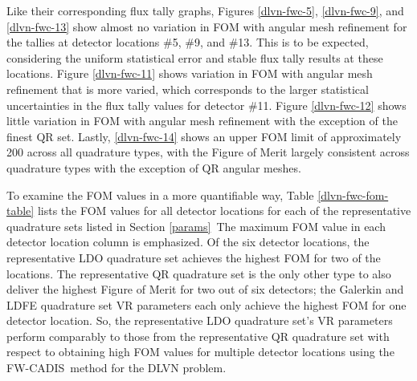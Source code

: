 \documentclass{article} %
\newcommand{\fwc}{\mbox{FW-CADIS}}
\begin{document}
Like their corresponding flux tally graphs, Figures \ref{dlvn-fwc-5},
\ref{dlvn-fwc-9}, and \ref{dlvn-fwc-13} show almost no variation in FOM with
angular mesh refinement for the tallies at detector locations \#5, \#9, and
\#13. This is to be expected, considering the uniform statistical error and
stable flux tally results at these locations. Figure \ref{dlvn-fwc-11} shows
variation in FOM with angular mesh refinement that is more varied, which
corresponds to the larger statistical uncertainties in the flux tally values
for detector \#11. Figure \ref{dlvn-fwc-12} shows little variation in FOM with
angular mesh refinement with the exception of the finest QR set. Lastly,
\ref{dlvn-fwc-14} shows an upper FOM limit of approximately 200 across all
quadrature types, with the Figure of Merit largely consistent across
quadrature types with the exception of QR angular meshes.

To examine the FOM values in a more quantifiable way, Table 
\ref{dlvn-fwc-fom-table} lists the FOM values for all detector locations for
each of the representative quadrature sets listed in Section \ref{params}\
The maximum FOM value in each detector location column is emphasized. Of the
six detector locations, the representative LDO quadrature set achieves the
highest FOM for two of the locations. The representative QR quadrature set is
the only other type to also deliver the highest Figure of Merit for two out of
six detectors; the Galerkin and LDFE quadrature set VR parameters each
only achieve the highest FOM for one detector location. So, the representative
LDO quadrature set's VR parameters perform comparably to those from the
representative QR quadrature set with respect to obtaining high FOM values for
multiple detector locations using the \fwc\ method for the DLVN problem.
\end{document}
